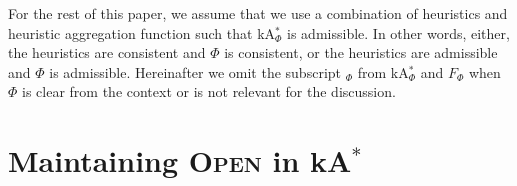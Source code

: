 \documentclass[smallextended]{svjour3}       %
\newcommand{\kastar}{kA$^*$\xspace}
\newcommand{\kastarphi}{\textup{kA}$^*_{\Phi}$\xspace}
\newcommand{\open}{\textsc{Open}\xspace}
\newcommand{\axiomadm}{admissible\xspace}
\newcommand{\axiomcons}{consistent\xspace}
\begin{document}



For the rest of this paper, we assume that we use a combination of heuristics and heuristic aggregation function such that \kastarphi is admissible. In other words, either, the heuristics are consistent and $\Phi$ is \axiomcons, or the heuristics are admissible and $\Phi$ is \axiomadm.
Hereinafter we omit the subscript $_\Phi$ from \kastarphi and $F_\Phi$ when $\Phi$ is clear from the context or is not relevant for the discussion. 






\section{Maintaining \open in \kastar}
\label{sec:lazy}



\end{document}
